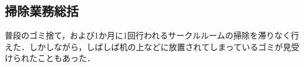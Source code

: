 \subsection*{掃除業務総括}

普段のゴミ捨て，および1か月に1回行われるサークルルームの掃除を滞りなく行えた．しかしながら，しばしば机の上などに放置されてしまっているゴミが見受けられたこともあった．
